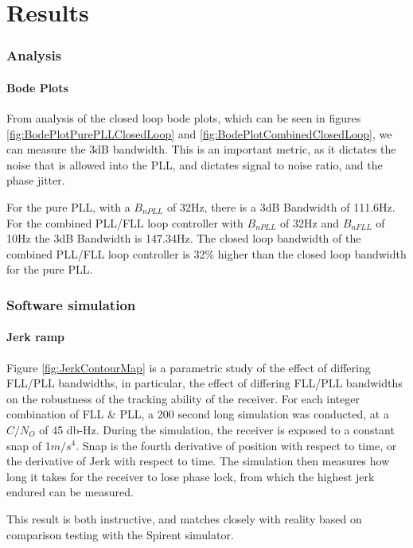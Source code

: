 \chapter{Results}\label{ch:Results}

\subsection{Analysis}

\subsubsection{Bode Plots}

From analysis of the closed loop bode plots, which can be seen in figures \ref{fig:BodePlotPurePLLClosedLoop} and \ref{fig:BodePlotCombinedClosedLoop}, we can measure the 3dB bandwidth. This is an important metric, as it dictates the noise that is allowed into the PLL, and dictates signal to noise ratio, and the phase jitter. 

For the pure PLL, with a $B_{nPLL}$ of 32Hz, there is a 3dB Bandwidth of 111.6Hz. For the combined PLL/FLL loop controller with  $B_{nPLL}$ of 32Hz and  $B_{nFLL}$ of 10Hz the 3dB Bandwidth is 147.34Hz. The closed loop bandwidth of the combined PLL/FLL loop controller is 32\% higher than the closed loop bandwidth for the pure PLL.


\subsection{Software simulation}

\subsubsection{Jerk ramp}

Figure \ref{fig:JerkContourMap} is a parametric study of the effect of differing FLL/PLL bandwidths, in particular, the effect of differing FLL/PLL bandwidths on the robustness of the tracking ability of the receiver. For each integer combination of FLL \& PLL, a 200 second long simulation was conducted, at a $C/N_O$ of 45 db-Hz. During the simulation, the receiver is exposed to a constant snap of 1$m/s^4$. Snap is the fourth derivative of position with respect to time, or the derivative of Jerk with respect to time. The simulation then measures how long it takes for the receiver to lose phase lock, from which the highest jerk endured can be measured. 

This result is both instructive, and matches closely with reality based on comparison testing with the Spirent simulator. 

